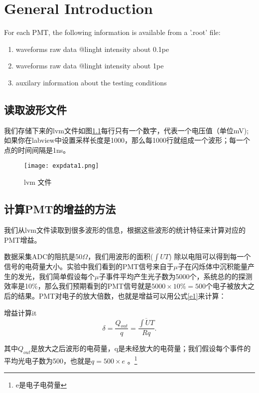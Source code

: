 \documentclass{elegantbook}
\author{ 物理楼\&220 }
\date{\today}
\begin{document}
\maketitle
\tableofcontents

\chapter{General Introduction }
For each PMT, the following information is available from a '.root' file:
\begin{enumerate}
	\item waveforms raw data @linght intensity about 0.1pe  
	\item waveforms raw data @linght intensity about 1pe  
	\item auxilary information about the testing conditions
\end{enumerate}

\section{读取波形文件}
我们存储下来的lvm文件如图\ref{fig:g}每行只有一个数字，代表一个电压值（单位mV);如果你在labview中设置采样长度是1000，那么每1000行就组成一个波形；每一个点的时间间隔是1ns。
\begin{figure}[!htbp]
	\centering
	\texttt{[image: expdata1.png]}
	\caption{lvm 文件\label{fig:g}}
\end{figure}


\section{计算PMT的增益的方法}
我们从lvm文件读取到很多波形的信息，根据这些波形的统计特征来计算对应的PMT增益。

数据采集ADC的阻抗是50$\Omega$，我们用波形的面积($\int UT$) 除以电阻可以得到每一个信号的电荷量大小。实验中我们看到的PMT信号来自于$\mu$子在闪烁体中沉积能量产生的发光，我们简单假设每个$\mu$子事件平均产生光子数为5000个，系统总的的探测效率是10\%，那么我们预期看到的PMT信号就是$5000\times 10\%=500$个电子被放大之后的结果。PMT对电子的放大倍数，也就是增益可以用公式\ref{e1}来计算：
\begin{definition}{增益计算}{it}
\begin{equation}
   \label{e1}
	\delta=\frac{Q_{out}}{q}=\frac{\overline{\int UT}}{Rq}.
\end{equation}
\end{definition}
其中$Q_{out}$是放大之后波形的电荷量，q是未经放大的电荷量；我们假设每个事件的平均光电子数为500，也就是$q=500\times e$ 。\footnote{e是电子电荷量}
\end{document}
